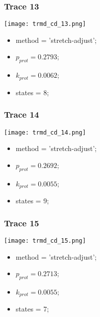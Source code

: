 \subsubsection{Trace 13}
\begin{minipage}[c]{0.7\textwidth}
	\texttt{[image: trmd\_cd\_13.png]}
\end{minipage}
\hfill
\begin{minipage}[c]{0.45\textwidth}
	\begin{itemize}
		\item method = 'stretch-adjust';
		\item $p_{prot}=0.2793$;
		\item $k_{prot}=0.0062$;
		\item states = 8;
	\end{itemize}
\end{minipage}

\subsubsection{Trace 14}
\begin{minipage}[c]{0.7\textwidth}
	\texttt{[image: trmd\_cd\_14.png]}
\end{minipage}
\hfill
\begin{minipage}[c]{0.45\textwidth}
	\begin{itemize}
		\item method = 'stretch-adjust';
		\item $p_{prot}=0.2692$;
		\item $k_{prot}=0.0055$;
		\item states = 9;
	\end{itemize}
\end{minipage}

\subsubsection{Trace 15}
\begin{minipage}[c]{0.7\textwidth}
	\texttt{[image: trmd\_cd\_15.png]}
\end{minipage}
\hfill
\begin{minipage}[c]{0.45\textwidth}
	\begin{itemize}
		\item method = 'stretch-adjust';
		\item $p_{prot}=0.2713$;
		\item $k_{prot}=0.0055$;
		\item states = 7;
	\end{itemize}
\end{minipage}


